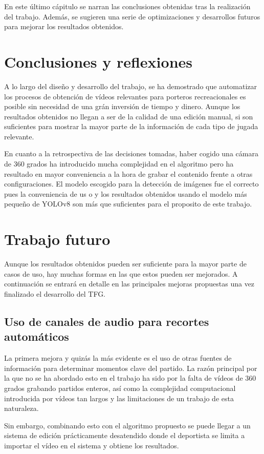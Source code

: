 En este último cápitulo se narran las conclusiones obtenidas tras la realización del trabajo. Además, se sugieren una serie de optimizaciones y desarrollos futuros para mejorar los resultados obtenidos.

\section{Conclusiones y reflexiones}
A lo largo del diseño y desarrollo del trabajo, se ha demostrado que automatizar los procesos de obtención de vídeos relevantes para porteros recreacionales es posible sin necesidad de una grán inversión de tiempo y dinero. Aunque los resultados obtenidos no llegan a ser de la calidad de una edición manual, si son suficientes para mostrar la mayor parte de la información de cada tipo de jugada relevante.

En cuanto a la retrospectiva de las decisiones tomadas, haber cogido una cámara de 360 grados ha introducido mucha complejidad en el algoritmo pero ha resultado en mayor conveniencia a la hora de grabar el contenido frente a otras configuraciones. El modelo escogido para la detección de imágenes fue el correcto pues la conveniencia de us o y los resultados obtenidos usando el modelo más pequeño de YOLOv8 son más que suficientes para el proposito de este trabajo.

\section{Trabajo futuro}
Aunque los resultados obtenidos pueden ser suficiente para la mayor parte de casos de uso, hay muchas formas en las que estos pueden ser mejorados. A continuación se entrará en detalle en las principales mejoras propuestas una vez finalizado el desarrollo del TFG.

\subsection{Uso de canales de audio para recortes automáticos}
La primera mejora y quizás la más evidente es el uso de otras fuentes de información para determinar momentos clave del partido. La razón principal por la que no se ha abordado esto en el trabajo ha sido por la falta de vídeos de 360 grados grabando partidos enteros, así como la complejidad computacional introducida por vídeos tan largos y las limitaciones de un trabajo de esta naturaleza.

Sin embargo, combinando esto con el algoritmo propuesto se puede llegar a un sistema de edición prácticamente desatendido donde el deportista se limita a importar el vídeo en el sistema y obtiene los resultados.

